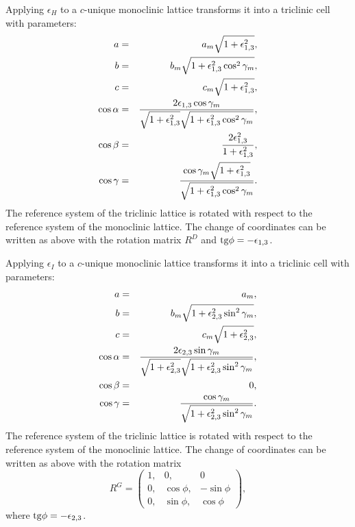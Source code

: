 \documentclass[12pt,a4paper]{article}
\begin{document}
Applying $\epsilon_H$ to a $c$-unique monoclinic lattice transforms
it into a triclinic cell with parameters:
\begin{eqnarray}
a&=&a_m \sqrt{1+\epsilon_{1,3}^2}, \\
b&=&b_m \sqrt{1+\epsilon_{1,3}^2 \cos^2\gamma_m}, \\
c&=&c_m \sqrt{1+\epsilon_{1,3}^2}, \\
\cos\alpha &=& {2 \epsilon_{1,3} \cos\gamma_m \over 
\sqrt{1+\epsilon_{1,3}^2} \sqrt{1+\epsilon_{1,3}^2 \cos^2\gamma_m}}, \\
\cos\beta &=& {2 \epsilon_{1,3}^2 \over 1+\epsilon_{1,3}^2}, \\
\cos\gamma &=& {\cos\gamma_m \sqrt{1+\epsilon_{1,3}^2} \over
\sqrt{1+\epsilon_{1,3}^2 \cos^2\gamma_m}}.
\end{eqnarray}
The reference system of the triclinic lattice is rotated 
with respect to the reference system of the  
monoclinic lattice. 
The change of coordinates can be written as above with the rotation matrix 
$R^D$ and ${\rm tg}\phi=-\epsilon_{1,3}$.

Applying $\epsilon_I$ to a $c$-unique monoclinic lattice transforms
it into a triclinic cell with parameters:
\begin{eqnarray}
a&=&a_m,  \\
b&=&b_m \sqrt{1+\epsilon_{2,3}^2 \sin^2\gamma_m}, \\
c&=&c_m \sqrt{1+\epsilon_{2,3}^2}, \\
\cos\alpha &=& {2 \epsilon_{2,3} \sin\gamma_m \over 
\sqrt{1+\epsilon_{2,3}^2} \sqrt{1+\epsilon_{2,3}^2 \sin^2\gamma_m}}, \\
\cos\beta &=& 0, \\
\cos\gamma &=& { \cos\gamma_m  \over
\sqrt{1+\epsilon_{2,3}^2 \sin^2\gamma_m}}.
\end{eqnarray}
The reference system of the triclinic lattice is rotated 
with respect to the reference system of the  
monoclinic lattice. 
The change of coordinates can be written as above with the rotation matrix 
\begin{equation}
R^G=\left( \begin{array}{ccc}
1, & 0, & 0 \\
0, & \cos \phi, &  -\sin \phi
\\
0, & \sin \phi, & \cos \phi 
\end{array}
\right),
\end{equation}
where  ${\rm tg}\phi=-\epsilon_{2,3}$.
\end{document}
